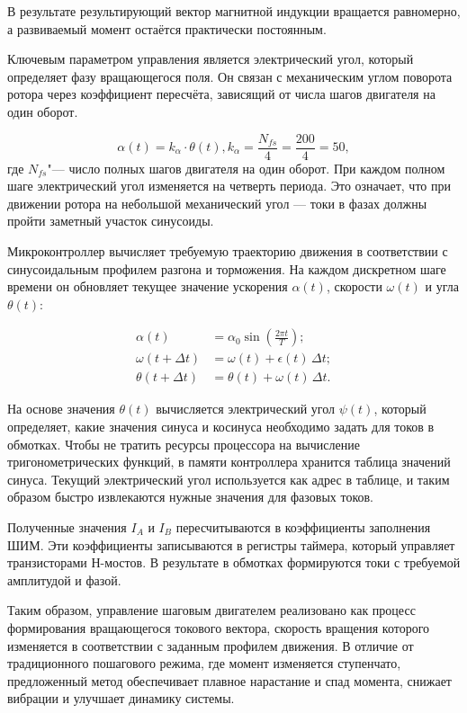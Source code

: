 В результате результирующий вектор магнитной индукции вращается равномерно, а развиваемый момент остаётся практически постоянным.

Ключевым параметром управления является электрический угол, который определяет фазу вращающегося поля. Он связан с механическим углом поворота ротора через коэффициент пересчёта, зависящий от числа шагов двигателя на один оборот.

\begin{equation}
	\label{eq:angle_electro}
	\alpha(t) =k_\alpha \cdot \theta(t), k_\alpha = \frac{N_{fs}}{4} = \frac{200}{4} = 50,
\end{equation}
где \(N_{fs}\)"--- число полных шагов двигателя на один оборот. При каждом полном шаге электрический угол изменяется на четверть периода. Это означает, что при движении ротора на небольшой механический угол --- токи в фазах должны пройти заметный участок синусоиды.

Микроконтроллер вычисляет требуемую траекторию движения в соответствии с синусоидальным профилем разгона и торможения. На каждом дискретном шаге времени он обновляет текущее значение ускорения $\alpha(t)$, скорости $\omega(t)$ и угла $\theta(t)$:

\begin{equation}
	\begin{aligned}
		\alpha(t) &= \alpha_0 \sin\!\left(\frac{2 \pi t}{T}\right); \\
		\omega(t + \Delta t) &= \omega(t) + \epsilon(t)\,\Delta t; \\
		\theta(t + \Delta t) &= \theta(t) + \omega(t)\,\Delta t.
	\end{aligned}
\end{equation}


На основе значения $\theta(t)$ вычисляется электрический угол $\psi(t)$, который определяет, какие значения синуса и косинуса необходимо задать для токов в обмотках. Чтобы не тратить ресурсы процессора на вычисление тригонометрических функций, в памяти контроллера хранится таблица значений синуса. Текущий электрический угол используется как адрес в таблице, и таким образом быстро извлекаются нужные значения для фазовых токов.

Полученные значения $I_A$ и $I_B$ пересчитываются в коэффициенты заполнения ШИМ. Эти коэффициенты записываются в регистры таймера, который управляет транзисторами Н-мостов. В результате в обмотках формируются токи с требуемой амплитудой и фазой.

Таким образом, управление шаговым двигателем реализовано как процесс формирования вращающегося токового вектора, скорость вращения которого изменяется в соответствии с заданным профилем движения. В отличие от традиционного пошагового режима, где момент изменяется ступенчато, предложенный метод обеспечивает плавное нарастание и спад момента, снижает вибрации и улучшает динамику системы.


